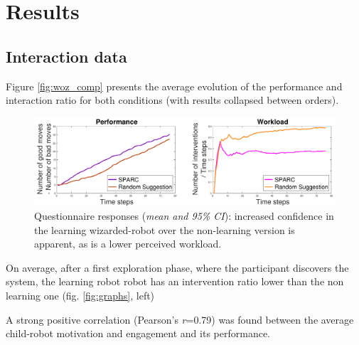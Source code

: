 \section{Results}

\subsection{Interaction data}

Figure \ref{fig:woz_comp} presents the average evolution of the performance and interaction ratio for both conditions (with results collapsed between orders).

\begin{figure}[t!]
	\centering
	\includegraphics[width=1.0\textwidth]{./images/woz_comp.pdf}
	\caption{Questionnaire responses (\textit{mean and 95\% CI}): increased confidence in the learning wizarded-robot over the non-learning version is apparent, as is a lower perceived workload.}
	\label{fig:questionnaires}
\end{figure}


On average, after a first exploration phase, where the participant discovers the system, 
the learning robot robot has an intervention ratio lower than the non learning one (fig. \ref{fig:graphs}, left)


A strong positive correlation (Pearson's \textit{r}=0.79) was found between the average child-robot motivation and engagement and its performance. 

